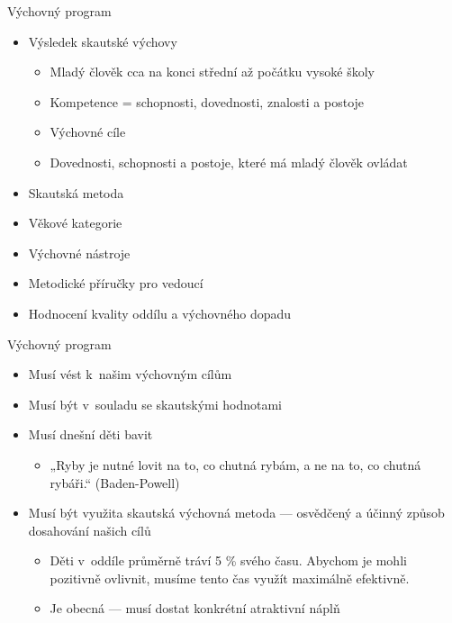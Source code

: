\documentclass[compress,xelatex,xcolor=dvipsnames,hyperref={pdfpagelabels=false},print]{beamer}
\begin{document}
\begin{frame}{Výchovný program}
\begin{itemize}
\item Výsledek skautské výchovy
 \begin{itemize}
 \item Mladý člověk cca na konci střední až počátku vysoké školy
 \item Kompetence = schopnosti, dovednosti, znalosti a postoje
 \item Výchovné cíle
 \item Dovednosti, schopnosti a postoje, které má mladý člověk ovládat
 \end{itemize}
\item Skautská metoda
\item Věkové kategorie
\item Výchovné nástroje
\item Metodické příručky pro vedoucí
\item Hodnocení kvality oddílu a výchovného dopadu
\end{itemize}
\end{frame}

\begin{frame}{Výchovný program}
\begin{itemize}
\item Musí vést k~našim výchovným cílům
\item Musí být v~souladu se skautskými hodnotami
\item Musí dnešní děti bavit
 \begin{itemize}
 \item „Ryby je nutné lovit na to, co chutná rybám, a ne na to, co chutná rybáři.“ (Baden-Powell)
 \end{itemize}
\item Musí být využita skautská výchovná metoda --- osvědčený a účinný způsob dosahování našich cílů
 \begin{itemize}
 \item Děti v~oddíle průměrně tráví 5 \% svého času. Abychom je mohli pozitivně ovlivnit, musíme tento čas využít maximálně efektivně.
 \item Je obecná --- musí dostat konkrétní atraktivní náplň
 \end{itemize}
\end{itemize}
\end{frame}
\end{document}
